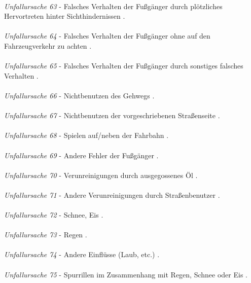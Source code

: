 \\
\textit{Unfallursache 63} - Falsches Verhalten der Fußgänger durch plötzliches Hervortreten hinter Sichthindernissen \parencite{PolizeiprasidiumOberbeyernSud.2016}.\\
\\
\textit{Unfallursache 64} - Falsches Verhalten der Fußgänger ohne auf den Fahrzeugverkehr zu achten \parencite{PolizeiprasidiumOberbeyernSud.2016}.\\
\\
\textit{Unfallursache 65} - Falsches Verhalten der Fußgänger durch sonstiges falsches Verhalten \parencite{PolizeiprasidiumOberbeyernSud.2016}.\\
\\
\textit{Unfallursache 66} - Nichtbenutzen des Gehwegs \parencite{PolizeiprasidiumOberbeyernSud.2016}.\\
\\
\textit{Unfallursache 67} - Nichtbenutzen der vorgeschriebenen Straßenseite \parencite{PolizeiprasidiumOberbeyernSud.2016}.\\
\\
\textit{Unfallursache 68} - Spielen auf/neben der Fahrbahn \parencite{PolizeiprasidiumOberbeyernSud.2016}.\\
\\
\textit{Unfallursache 69} - Andere Fehler der Fußgänger \parencite{PolizeiprasidiumOberbeyernSud.2016}.\\
\\
\textit{Unfallursache 70} - Verunreinigungen durch ausgegossenes Öl \parencite{PolizeiprasidiumOberbeyernSud.2016}.\\
\\
\textit{Unfallursache 71} - Andere Verunreinigungen durch Straßenbenutzer \parencite{PolizeiprasidiumOberbeyernSud.2016}.\\
\\
\textit{Unfallursache 72} - Schnee, Eis \parencite{PolizeiprasidiumOberbeyernSud.2016}.\\
\\
\textit{Unfallursache 73} - Regen \parencite{PolizeiprasidiumOberbeyernSud.2016}.\\
\\
\textit{Unfallursache 74} - Andere Einflüsse (Laub, etc.) \parencite{PolizeiprasidiumOberbeyernSud.2016}.\\
\\
\textit{Unfallursache 75} - Spurrillen im Zusammenhang mit Regen, Schnee oder Eis \parencite{PolizeiprasidiumOberbeyernSud.2016}.\\
